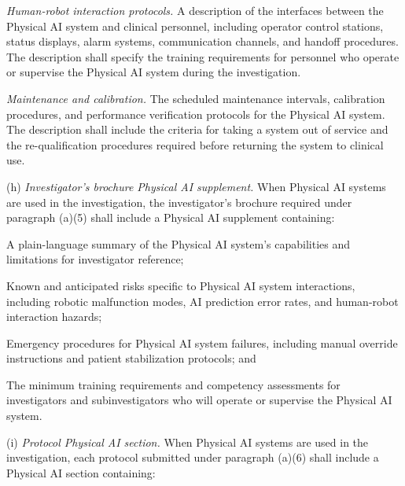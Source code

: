 \begin{description}[leftmargin=0.8cm,style=sameline]
\item[(x)] \textit{Human-robot interaction protocols.} A description of the interfaces between the Physical AI system and clinical personnel, including operator control stations, status displays, alarm systems, communication channels, and handoff procedures. The description shall specify the training requirements for personnel who operate or supervise the Physical AI system during the investigation.

\item[(xi)] \textit{Maintenance and calibration.} The scheduled maintenance intervals, calibration procedures, and performance verification protocols for the Physical AI system. The description shall include the criteria for taking a system out of service and the re-qualification procedures required before returning the system to clinical use.
\end{description}

(h) \textit{Investigator's brochure Physical AI supplement.} When Physical AI systems are used in the investigation, the investigator's brochure required under paragraph (a)(5) shall include a Physical AI supplement containing:

\begin{description}[leftmargin=0.8cm,style=sameline]
\item[(i)] A plain-language summary of the Physical AI system's capabilities and limitations for investigator reference;
\item[(ii)] Known and anticipated risks specific to Physical AI system interactions, including robotic malfunction modes, AI prediction error rates, and human-robot interaction hazards;
\item[(iii)] Emergency procedures for Physical AI system failures, including manual override instructions and patient stabilization protocols; and
\item[(iv)] The minimum training requirements and competency assessments for investigators and subinvestigators who will operate or supervise the Physical AI system.
\end{description}

(i) \textit{Protocol Physical AI section.} When Physical AI systems are used in the investigation, each protocol submitted under paragraph (a)(6) shall include a Physical AI section containing:

